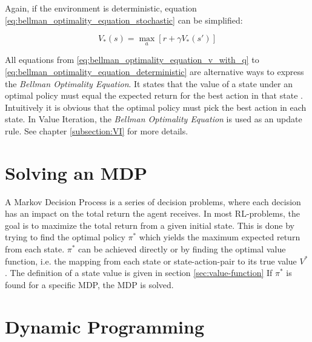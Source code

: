 Again, if the environment is deterministic, equation \ref{eq:bellman_optimality_equation_stochastic} can be simplified:

\begin{equation}
V_*(s) = \max_a[r+\gamma V_*(s')]
\label{eq:bellman_optimality_equation_deterministic}
\end{equation}

All equations from \ref{eq:bellman_optimality_equation_v_with_q} to \ref{eq:bellman_optimality_equation_deterministic} are alternative ways to express the \textit{Bellman Optimality Equation}. It states that the value of a state under an optimal policy must equal the expected return for the best action in that state \cite{SuttonBarto2018}. Intuitively it is obvious that the optimal policy must pick the best action in each state. In Value Iteration, the \textit{Bellman Optimality Equation} is used as an update rule. See chapter \ref{subsection:VI} for more details.

\section{Solving an MDP}

A Markov Decision Process is a series of decision problems, where each decision has an impact on the total return the agent receives. In most RL-problems, the goal is to maximize the total return from a given initial state. This is done by trying to find the optimal policy $\pi^*$ which yields the maximum expected return from each state. $\pi^*$ can be achieved directly or by finding the optimal value function, i.e. the mapping from each state or state-action-pair to its true value $V^*$. The definition of a state value is given in section \ref{sec:value-function} If $\pi^*$ is found for a specific MDP, the MDP is solved.

\section{Dynamic Programming}
\label{chapter3}

